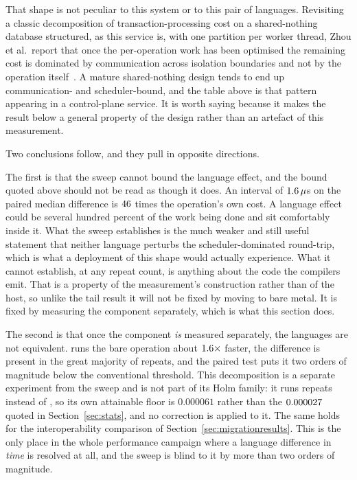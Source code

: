 \documentclass[english,twoside,openright,a4paper,censored,csm,software-track-2020]{HYthesisML}
\begin{document}
That shape is not peculiar to this system or to this pair of languages. Revisiting a classic
decomposition of transaction-processing cost on a shared-nothing database structured, as this
service is, with one partition per worker thread, Zhou et al.\ report that once the
per-operation work has been optimised the remaining cost is dominated by communication across
isolation boundaries and not by the operation itself~\cite{zhou2025oltp}. A mature
shared-nothing design tends to end up communication- and scheduler-bound, and the table above is
that pattern appearing in a control-plane service. It is worth saying because it makes the result
below a general property of the design rather than an artefact of this measurement.

Two conclusions follow, and they pull in opposite directions.

The first is that the sweep cannot bound the language effect, and the bound quoted above should
not be read as though it does. An interval of $1.6\,\mu$s on the paired median
difference is $46$ times the operation's own cost. A language effect could be
several hundred percent of the work being done and sit comfortably inside it. What the sweep
establishes is the much weaker and still useful statement that neither language perturbs the
scheduler-dominated round-trip, which is what a deployment of this shape would actually
experience. What it cannot establish, at any repeat count, is anything about the code the
compilers emit. That is a property of the measurement's construction rather than of the host,
so unlike the tail result it will not be fixed by moving to bare metal. It is fixed by
measuring the component separately, which is what this section does.

The second is that once the component \emph{is} measured separately, the languages are not
equivalent. \BudgetCoreFaster{} runs the bare operation about $1.6\times$ faster,
the difference is present in the great majority of repeats, and the paired test puts it two
orders of magnitude below the conventional threshold. This decomposition is a separate
experiment from the sweep and is not part of its Holm family: it runs \BudgetRepeats{} repeats
instead of \NRepeats{}, so its own attainable floor is $0.000061$ rather than the
$0.000027$ quoted in Section~\ref{sec:stats}, and no correction is applied to it. The
same holds for the interoperability comparison of Section~\ref{sec:migrationresults}. This is
the only place in the whole performance campaign where a
language difference in \emph{time} is resolved at all, and the sweep is blind to it by more
than two orders of magnitude.
\end{document}
